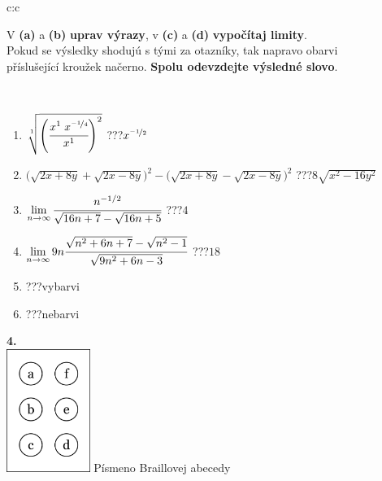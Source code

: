 \documentclass[10pt]{report}
\begin{document}
\begin{tabular}{c:c}
\begin{minipage}[c][104.5mm][t]{0.5\linewidth}
\begin{center}
\begin{minipage}{0.95\linewidth}
\begin{center}
V \textbf{(a)} a \textbf{(b)} \textbf{uprav výrazy}, v \textbf{(c)} a \textbf{(d)} \textbf{vypočítaj limity}.\\Pokud se výsledky shodujú s tými za otazníky, tak napravo obarvi\\příslušející kroužek načerno. \textbf{Spolu odevzdejte výsledné slovo}.
\end{center}
\end{minipage}
\\[1mm]
\begin{minipage}{0.79\linewidth}
\begin{center}
\begin{varwidth}{\linewidth}
\begin{enumerate}
\small
\item $\sqrt[1]{\left(\cfrac{x^{1}\;x^{\nicefrac{-1}{4}}}{x^{1}}\right)^{2}}$\quad \dotfill\; ???\;\dotfill \quad $x^{\nicefrac{-1}{2}}$
\item {\footnotesize{\scriptsize$\big(\sqrt{2x+8y}+\sqrt{2x-8y}\big)^2-\big(\sqrt{2x+8y}-\sqrt{2x-8y}\big)^2$}\quad \dotfill\; ???\;\dotfill \quad $8\sqrt{x^2-16y^2}$}
\item $\lim\limits_{n\to\infty}\cfrac{n^{-1/2}}{\sqrt{16n+7}-\sqrt{16n+5}}$\quad \dotfill\; ???\;\dotfill \quad $4$
\item $\lim\limits_{n\to\infty}9n\cfrac{\sqrt{n^2+6n+7}-\sqrt{n^2-1}}{\sqrt{9n^2+6n-3}}$\quad \dotfill\; ???\;\dotfill \quad $18$
\item \quad \dotfill\; ???\;\dotfill \quad vybarvi
\item \quad \dotfill\; ???\;\dotfill \quad nebarvi
\end{enumerate}
\end{varwidth}
\end{center}
\end{minipage}
\begin{minipage}{0.20\linewidth}
\begin{center}
{\Huge\bfseries 4.} \\[2mm]
\includegraphics[height=40mm]{../images/braille.png}
{\small Písmeno Braillovej abecedy}
\end{center}
\end{minipage}
\end{center}
\end{minipage}
%
\end{tabular}
\end{document}
